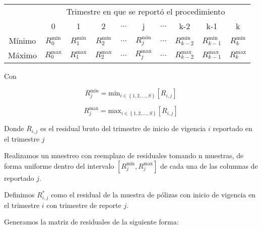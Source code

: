 \documentclass[11pt,twoside,openright,spanish]{report}
\numberwithin{equation}{chapter}
\numberwithin{figure}{chapter}
\numberwithin{table}{chapter}
\begin{document}
	\begin{table}[ht]
		\centering
		\begin{tabularx}{\linewidth}{ c|ccccccccc}
			& \multicolumn{9}{c}{Trimestre en que se reportó el procedimiento} \\
			& 0  & 1 & 2 & $ \dots $ & j & $\dots $ & k-2 & k-1 &  k\\
			\midrule
			Mínimo      &  $R_{0}^{\text{min}}$ & $R_{1}^{\text{min}}$ & $R_{2}^{\text{min}}$ & $ \dots $ & $R_{j}^{\text{min}}$ & $ \dots $ & $R_{k-2}^{\text{min}}$ & $R_{k-1}^{\text{min}}$ & $R_{k}^{\text{min}}$ \\
			Máximo      &  $R_{0}^{\text{max}}$ & $R_{1}^{\text{max}}$ & $R_{2}^{\text{max}}$ & $ \dots $ & $R_{j}^{\text{max}}$ & $ \dots $ & $R_{k-2}^{\text{max}}$ & $R_{k-1}^{\text{max}}$ & $R_{k}^{\text{max}}$ \\
		\end{tabularx}
	\end{table}
	
	Con

	$$R_{j}^{\text{min}}= \text{min}_{ i\in \left\{1,2,\dots ,S\right\}} \left[R_{i,j}^{}\right]$$	
	
	$$R_{j}^{\text{max}}= \text{max}_{ i\in \left\{1,2,\dots ,S\right\}} \left[R_{i,j}^{}\right]$$	 

	Donde $R_{i,j}$ es el residual bruto del trimestre de inicio de vigencia $i$ reportado en el trimestre $j$

	Realizamos un muestreo con reemplazo de residuales tomando n muestras, de forma uniforme dentro del intervalo $\left[R_{j}^{\text{min}},R_{j}^{\text{max}}\right]$ de cada una de las columnas de reportado $j$.
	
	Definimos $R_{i,j}^{*}$ como el residual de la muestra de pólizas con inicio de vigencia en el trimestre $i$ con trimestre de reporte $j$. 
	
	Generamos la matriz de residuales de la siguiente forma:
	
\end{document}
